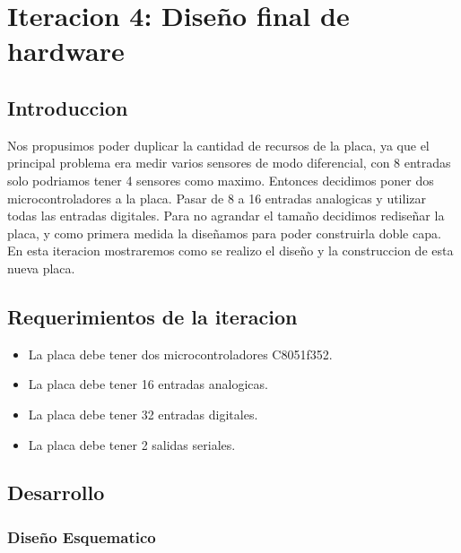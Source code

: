 \chapter{Iteracion 4: Diseño final de hardware} %
\label{cha:iteracion_4}

\section{Introduccion} %
\label{sec:introduccion}

Nos propusimos poder duplicar la cantidad de recursos de la placa, ya que el principal problema era medir varios sensores de modo diferencial, con 8 entradas solo podriamos tener 4 sensores como maximo. Entonces decidimos poner dos microcontroladores a la placa. Pasar de 8 a 16 entradas analogicas y utilizar todas las entradas digitales. 
Para no agrandar el tamaño decidimos rediseñar la placa, y como primera medida la diseñamos para poder construirla doble capa.
En esta iteracion mostraremos como se realizo el diseño y la construccion de esta nueva placa.


\section{Requerimientos de la iteracion} %
\label{sec:requerimientos_de_la_iteracion}

\begin{itemize}
	\item La placa debe tener dos microcontroladores C8051f352.
	\item La placa debe tener 16 entradas analogicas.
	\item La placa debe tener 32 entradas digitales.
	\item La placa debe tener 2 salidas seriales. 
\end{itemize}


\section{Desarrollo} %
\label{sec:desarrollo}

\subsection{Diseño Esquematico}
\label{diseño_esquematico2}

